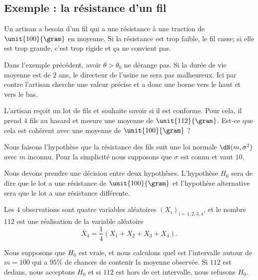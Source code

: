 \subsection{Exemple : la résistance d'un fil}
\label{subsecExempLFilResituzz}

Un artisan a besoin d'un fil qui a une résistance à une traction de \( \unit{100}{\gram}\) en moyenne. Si la résistance est trop faible, le fil casse; si elle est trop grande, c'est trop rigide et ça ne convient pas.

\begin{remark}
	Dans l'exemple précédent, avoir \( \theta>\theta_0\) ne dérange pas. Si la durée de vie moyenne est de \( 2\) ans, le directeur de l'usine ne sera pas malheureux. Ici par contre l'artisan cherche une valeur précise et a donc une borne vers le haut et vers le bas.
\end{remark}

L'artisan reçoit un lot de fils et souhaite savoir si il est conforme. Pour cela, il prend \( 4\) fils au hasard et mesure une moyenne de \( \unit{112}{\gram}\). Est-ce que cela est cohérent avec une moyenne de \( \unit{100}{\gram}\) ?

Nous faisons l'hypothèse que la résistance des fils suit une loi normale \( \dN(m,\sigma^2)\) avec \( m\) inconnu. Pour la simplicité nous supposons que \( \sigma\) est connu et vaut \( 10\).

Nous devons prendre une décision entre deux hypothèses. L'hypothèse \( H_0\) sera de dire que le lot a une résistance de \( \unit{100}{\gram}\) et l'hypothèse alternative sera que le lot a une résistance différente.

Les \( 4\) observations sont quatre variables aléatoires \( (X_i)_{i=1,2,3,4}\), et le nombre \( 112\) est une réalisation de la variable aléatoire
\begin{equation}
	\bar X_4=\frac{1}{ 4 }(X_1+X_2+X_3+X_4).
\end{equation}

Nous supposons que \( H_0\) est vraie, et nous calculons quel est l'intervalle autour de \( m=100\) qui a \( 95\%\) de chances de contenir la moyenne observée. Si \( 112\) est dedans, nous acceptons \( H_0\) et si \( 112\) est hors de cet intervalle, nous refusons \( H_0\).

